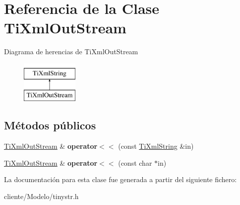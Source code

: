 \hypertarget{classTiXmlOutStream}{\section{\-Referencia de la \-Clase \-Ti\-Xml\-Out\-Stream}
\label{classTiXmlOutStream}
}
\-Diagrama de herencias de \-Ti\-Xml\-Out\-Stream\begin{figure}[H]
\begin{center}
\leavevmode
\includegraphics[height=2.000000cm]{classTiXmlOutStream}
\end{center}
\end{figure}
\subsection*{\-Métodos públicos}
\begin{DoxyCompactItemize}
\item 
\hypertarget{classTiXmlOutStream_a3640dcb1c0903be3bc6966cdc9a79db6}{\hyperlink{classTiXmlOutStream}{\-Ti\-Xml\-Out\-Stream} \& {\bfseries operator$<$$<$} (const \hyperlink{classTiXmlString}{\-Ti\-Xml\-String} \&in)}\label{classTiXmlOutStream_a3640dcb1c0903be3bc6966cdc9a79db6}

\item 
\hypertarget{classTiXmlOutStream_af2117e5a8cbfcb69544804ad2859bfb6}{\hyperlink{classTiXmlOutStream}{\-Ti\-Xml\-Out\-Stream} \& {\bfseries operator$<$$<$} (const char $\ast$in)}\label{classTiXmlOutStream_af2117e5a8cbfcb69544804ad2859bfb6}

\end{DoxyCompactItemize}


\-La documentación para esta clase fue generada a partir del siguiente fichero\-:\begin{DoxyCompactItemize}
\item 
cliente/\-Modelo/tinystr.\-h\end{DoxyCompactItemize}
